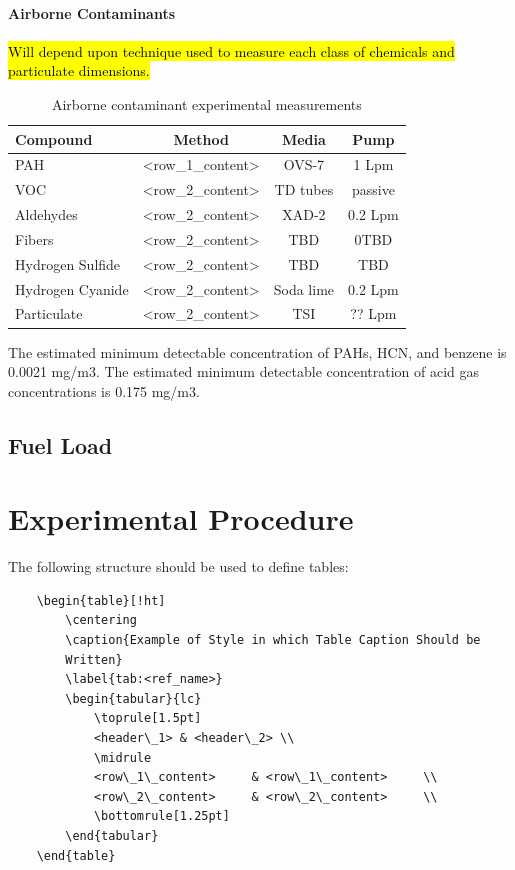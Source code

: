 \documentclass[12pt,oneside]{book}
\begin{document}
\subsubsection*{Airborne Contaminants}
\hl{Will depend upon technique used to measure each class of chemicals and particulate dimensions.} 


\begin{table}[!ht]
	\centering
	\caption{Airborne contaminant experimental measurements}
	\begin{tabular}{lccc}
		\toprule[1.5pt]
		Compound & Method & Media & Pump \\
		\midrule
		PAH   				& <row\_1\_content>     & OVS-7     & 1 Lpm     \\
		VOC    				& <row\_2\_content>     & TD tubes 	& passive    \\
		Aldehydes   	 	& <row\_2\_content>     & XAD-2    	& 0.2 Lpm    \\
		Fibers    			& <row\_2\_content>     & TBD    	& 0TBD   \\
		Hydrogen Sulfide  	& <row\_2\_content>     & TBD    	& TBD    \\
		Hydrogen Cyanide   	& <row\_2\_content>     & Soda lime	& 0.2 Lpm    \\
		Particulate   		& <row\_2\_content>     & TSI    	& ?? Lpm    \\
		\bottomrule[1.25pt]
	\end{tabular}
\end{table}
The estimated minimum detectable concentration of PAHs, HCN, and benzene  is  0.0021 mg/m3.
The estimated minimum detectable concentration of acid gas concentrations is 0.175 mg/m3.


\section{Fuel Load}

\chapter{Experimental Procedure}
\label{chap:exp_procedure}

The following structure should be used to define tables:
\begin{verbatim}
	\begin{table}[!ht]
	    \centering
	    \caption{Example of Style in which Table Caption Should be 
        Written}
	    \label{tab:<ref_name>}
	    \begin{tabular}{lc}
	        \toprule[1.5pt]
	        <header\_1> & <header\_2> \\
	        \midrule
	        <row\_1\_content>     & <row\_1\_content>     \\
	        <row\_2\_content>     & <row\_2\_content>     \\
	        \bottomrule[1.25pt]
	    \end{tabular}
	\end{table}
\end{verbatim}
\end{document}
